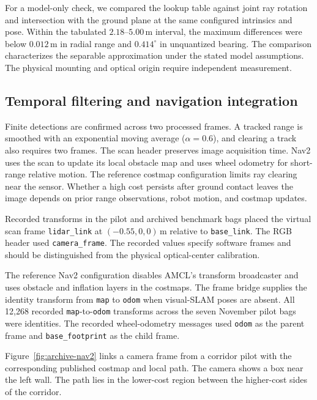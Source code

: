 \documentclass[pdflatex,sn-mathphys-num]{sn-jnl}
\newcommand{\m}{\,\mathrm{m}}
\begin{document}
For a model-only check, we compared the lookup table against joint ray rotation and intersection with the ground plane at the same configured intrinsics and pose. Within the tabulated $2.18$--$5.00\m$ interval, the maximum differences were below $0.012\m$ in radial range and $0.414^\circ$ in unquantized bearing. The comparison characterizes the separable approximation under the stated model assumptions. The physical mounting and optical origin require independent measurement.

\subsection{Temporal filtering and navigation integration}\label{sec:deployed-setup}

Finite detections are confirmed across two processed frames. A tracked range is smoothed with an exponential moving average ($\alpha=0.6$), and clearing a track also requires two frames. The scan header preserves image acquisition time. Nav2 uses the scan to update its local obstacle map and uses wheel odometry for short-range relative motion. The reference costmap configuration limits ray clearing near the sensor. Whether a high cost persists after ground contact leaves the image depends on prior range observations, robot motion, and costmap updates.

Recorded transforms in the pilot and archived benchmark bags placed the virtual scan frame \texttt{lidar\_link} at $(-0.55,0,0)\m$ relative to \texttt{base\_link}. The RGB header used \texttt{camera\_frame}. The recorded values specify software frames and should be distinguished from the physical optical-center calibration.

The reference Nav2 configuration disables AMCL's transform broadcaster and uses obstacle and inflation layers in the costmaps. The frame bridge supplies the identity transform from \texttt{map} to \texttt{odom} when visual-SLAM poses are absent. All 12,268 recorded \texttt{map}-to-\texttt{odom} transforms across the seven November pilot bags were identities. The recorded wheel-odometry messages used \texttt{odom} as the parent frame and \texttt{base\_footprint} as the child frame.

Figure~\ref{fig:archive-nav2} links a camera frame from a corridor pilot with the corresponding published costmap and local path. The camera shows a box near the left wall. The path lies in the lower-cost region between the higher-cost sides of the corridor.
\end{document}
